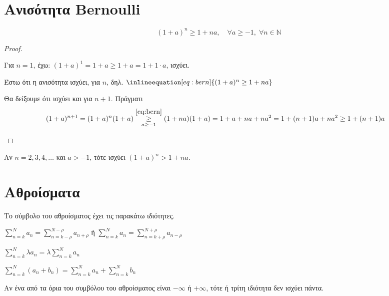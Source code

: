 \documentclass[main.tex]{subfiles}
\begin{document}
\section{Ανισότητα Bernoulli}
\[
  \boxed{(1+a)^{n} \geq 1 + na, \quad \forall a \geq -1, \; \forall n \in
  \mathbb{N}}
\] 
\begin{proof}
\item {}
  \begin{myitemize}
    \item Για $ n=1 $, έχω: $ (1+a)^{1} = 1+a \geq 1+a = 1 + 1 \cdot a $, ισχύει.
    \item Έστω ότι η ανισότητα ισχύει, για $ n $, δηλ. $\inlineequation[eq:bern]
      {(1+a)^{n} \geq 1 + na}$
    \item Θα δείξουμε ότι ισχύει και για $ n+1 $. Πράγματι
      \begin{align*}
        (1+a)^{n+1} = (1+a)^{n}(1+a) \overset{\eqref{eq:bern}}
        {\underset{a \geq -1}{\geq}} (1+na)(1+a) &= 1 + a + na + na^{2} 
        = 1 + (n+1)a + na^{2} \geq 1 + (n+1)a
      \end{align*}
  \end{myitemize}
\end{proof}

\begin{rem}
  Αν $ n=2,3,4,\ldots $ και $ a>-1 $, τότε ισχύει $ (1+a)^{n}>1+na $.
\end{rem}

\section{Αθροίσματα}


Το σύμβολο του αθροίσματος έχει τις παρακάτω ιδιότητες.
{
  \everymath{\displaystyle}
\begin{myitemize}
  \item $ \sum_{n=k}^{N} a_{n} = \sum_{n=k- \rho }^{N- \rho } a_{n+ \rho} $ ή  
$ \sum_{n=k}^{N} a_{n} = \sum_{n=k+ \rho }^{N+ \rho } a_{n- \rho} $
  \item $ \sum_{n=k}^{N} \lambda a_{n} = \lambda \sum_{n=k}^{N} a_{n} $ 
  \item $ \sum_{n=k}^{N} (a_{n}+b_{n}) = \sum_{n=k}^{N} a_{n} + \sum_{n=k}^{N} b_{n} $ 
\end{myitemize}
}

\begin{rem}
  Αν ένα από τα όρια του συμβόλου του αθροίσματος είναι $ - \infty $ ή $ + \infty $, 
  τότε ή τρίτη ιδιότητα δεν ισχύει πάντα.
\end{rem}
\end{document}
